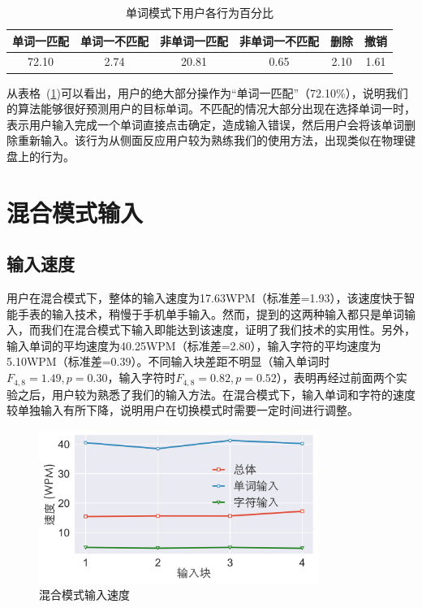 \begin{table}[h]
  \centering
  \begin{minipage}[t]{0.9\linewidth} %
  \caption[单词模式下用户各行为百分比]{单词模式下用户各行为百分比}
  \label{tab:word-stat}
    \centering
    \begin{tabularx}{\linewidth}{cccccc}
      \toprule[1.5pt]
      单词一匹配 & 单词一不匹配 & 非单词一匹配 & 非单词一不匹配 & 删除 & 撤销\\\midrule[1pt]
      72.10 & 2.74 & 20.81 & 0.65 & 2.10 & 1.61\\
      \bottomrule[1.5pt]
    \end{tabularx}
  \end{minipage}
\end{table}

从表格~(\ref{tab:word-stat})可以看出，用户的绝大部分操作为“单词一匹配”（72.10\%），说明我们的算法能够很好预测用户的目标单词。不匹配的情况大部分出现在选择单词一时，表示用户输入完成一个单词直接点击确定，造成输入错误，然后用户会将该单词删除重新输入。该行为从侧面反应用户较为熟练我们的使用方法，出现类似在物理键盘上的行为。


\section{混合模式输入} 

\subsection{输入速度}
用户在混合模式下，整体的输入速度为17.63WPM（标准差=1.93），该速度快于智能手表的输入技术\cite{compass}，稍慢于手机单手输入\cite{2017blindtype}。然而，提到的这两种输入都只是单词输入，而我们在混合模式下输入即能达到该速度，证明了我们技术的实用性。另外，输入单词的平均速度为40.25WPM（标准差=2.80），输入字符的平均速度为5.10WPM（标准差=0.39）。不同输入块差距不明显（输入单词时$F_{4,8}=1.49, p =0.30$，输入字符时$F_{4,8}=0.82, p =0.52$），表明再经过前面两个实验之后，用户较为熟悉了我们的输入方法。在混合模式下，输入单词和字符的速度较单独输入有所下降，说明用户在切换模式时需要一定时间进行调整。

\begin{figure}[h] %
    \centering
    \includegraphics[height=5cm]{figures/wholespeed.png}
    \caption{混合模式输入速度}
    \label{fig:wholespeed}
\end{figure}


